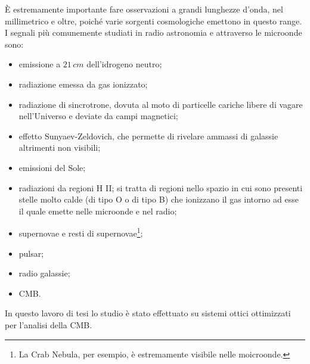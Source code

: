 \documentclass[12pt,a4paper,final]{book}
\begin{document}
\`E estremamente importante fare osservazioni a grandi lunghezze d'onda, nel millimetrico e oltre, poiché varie sorgenti cosmologiche emettono in questo range.
I segnali più comunemente studiati in radio astronomia e attraverso le microonde sono:
\begin{itemize}
	\item emissione a $21\,\unit{cm}$ dell'idrogeno neutro;
	\item radiazione emessa da gas ionizzato;
	\item radiazione di sincrotrone, dovuta al moto di particelle cariche libere di vagare nell'Universo e deviate da campi magnetici;
	\item effetto Sunyaev-Zeldovich, che permette di rivelare ammassi di galassie altrimenti non visibili;
	\item emissioni del Sole;
	\item radiazioni da regioni H II; si tratta di regioni nello spazio in cui sono presenti stelle molto calde (di tipo O o di tipo B) che ionizzano il gas intorno ad esse il quale emette nelle microonde e nel radio;
	\item supernovae e resti di supernovae\footnote{La Crab Nebula, per esempio, è estremamente visibile nelle moicroonde.};
	\item pulsar;
	\item radio galassie;
	\item CMB.
\end{itemize}
In questo lavoro di tesi lo studio è stato effettuato su sistemi ottici ottimizzati per l'analisi della CMB.
\end{document}
